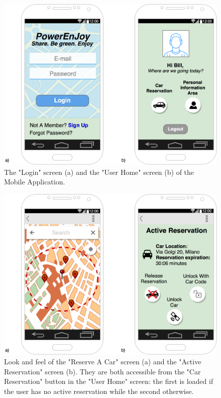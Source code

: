 \begin{figure}[H]
\centering
		\includegraphics[width=\textwidth]{./user_interface_design/diagrams/mobile_login_home.png}
		\caption{The "Login" screen (a) and the "User Home" screen (b) of the Mobile Application.}
		\label{mobile_login_home}
\end{figure}

\begin{figure}[H]
\centering
		\includegraphics[width=\textwidth]{./user_interface_design/diagrams/mobile_res_unlock.png}
		\caption{Look and feel of the "Reserve A Car" screen (a) and the "Active Reservation" screen (b). They are both accessible from the "Car Reservation" button in the "User Home" screen: the first is loaded if the user has no active reservation while the second otherwise.}
		\label{mobile_res_unlock}
\end{figure}

